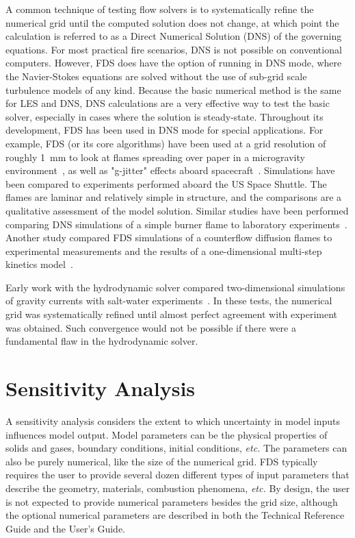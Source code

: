 \documentclass[11pt]{book}
\begin{document}
A common technique of testing flow solvers is to systematically refine the numerical grid until the computed solution does not change, at which point
the calculation is referred to as a Direct Numerical Solution (DNS) of the governing equations.  For most practical fire scenarios, DNS is not
possible on conventional computers. However, FDS does have the option of running in DNS mode, where the Navier-Stokes equations are solved without
the use of sub-grid scale turbulence models of any kind. Because the basic numerical method is the same for LES and DNS, DNS calculations are a very
effective way to test the basic solver, especially in cases where the solution is steady-state. Throughout its development, FDS has been used in DNS
mode for special applications.  For example, FDS (or its core algorithms) have been used at a grid resolution of roughly 1~mm to look at flames
spreading over paper in a microgravity environment~\cite{McGrattan:C&F1996,Kashiwagi:CS1996,Mell:CS98,Mell:CS00,Prasad:CS2002,Nakamura:C&F2002}, as
well as "g-jitter" effects aboard spacecraft~\cite{Mell:g-jitter}. Simulations have been compared to experiments performed aboard the US Space
Shuttle.  The flames are laminar and relatively simple in structure, and the comparisons are a qualitative assessment of the model solution. Similar
studies have been performed comparing DNS simulations of a simple burner flame to laboratory experiments~\cite{Mukhopadhyay:1}. Another study
compared FDS simulations of a counterflow diffusion flames to experimental measurements and the results of a one-dimensional multi-step kinetics
model~\cite{Hamins:NASA}.

Early work with the hydrodynamic solver compared two-dimensional simulations of gravity currents with salt-water experiments~\cite{McGrattan:1}. In
these tests, the numerical grid was systematically refined until almost perfect agreement with experiment was obtained. Such convergence would not be
possible if there were a fundamental flaw in the hydrodynamic solver.




\section{Sensitivity Analysis}

A sensitivity  analysis considers the  extent to which  uncertainty in model  inputs influences  model output.  Model parameters  can  be the
physical properties of solids  and gases, boundary conditions, initial conditions, {\em  etc.} The parameters  can also be  purely numerical, like
the size  of the numerical grid. FDS  typically requires the user to  provide several  dozen different  types of  input  parameters that describe the
geometry, materials,  combustion phenomena, {\em etc.} By design,  the user  is  not expected  to  provide numerical  parameters besides the grid
size,  although the optional numerical parameters are described in both the Technical Reference Guide and the User's Guide.
\end{document}

